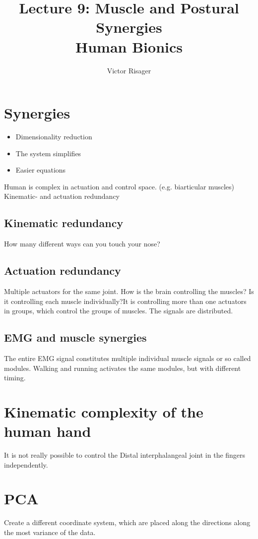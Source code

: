 \documentclass[a4paper]{article}
\title{Lecture 9: Muscle and Postural Synergies  \\
	\large Human Bionics}
\author{Victor Risager}
\begin{document}
\maketitle


\section{Synergies}

\begin{itemize}
	\item Dimensionality reduction
	\item The system simplifies
	\item Easier equations 
\end{itemize}
Human is complex in actuation and control space. (e.g. biarticular muscles)
Kinematic- and actuation redundancy

\subsection{Kinematic redundancy}
How many different ways can you touch your nose?

\subsection{Actuation redundancy}
Multiple actuators for the same joint.
How is the brain controlling the muscles? Is it controlling each muscle individually?It is controlling more than one actuators in groups, which control the groups of muscles. The signals are distributed.


\subsection{EMG and muscle synergies}
The entire EMG signal constitutes multiple individual muscle signals or so called modules. Walking and running activates the same modules, but with different timing.


\section{Kinematic complexity of the human hand}
It is not really possible to control the Distal interphalangeal joint in the fingers independently.



\section{PCA}
Create a different coordinate system, which are placed along the directions along the most variance of the data.
\end{document}
